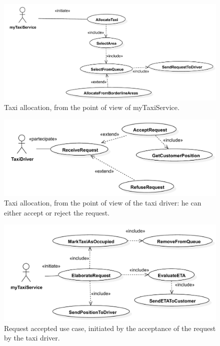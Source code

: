 \begin{figure}
	\includegraphics[width=\textwidth]{img/U_TaxiAllocation}
	\caption{Taxi allocation, from the point of view of myTaxiService.}
\end{figure}


\begin{figure}[!htbp]
	\includegraphics[width=\textwidth]{img/U_DriverRequestEvaluation.pdf}
	\caption{Taxi allocation, from the point of view of the taxi driver: he can either accept or reject the request.}
\end{figure}


\clearpage

\begin{figure}
	\includegraphics[width=\textwidth]{img/U_RequestAccepted}
	\caption{Request accepted use case, initiated by the acceptance of the request by the taxi driver.}
\end{figure}	


